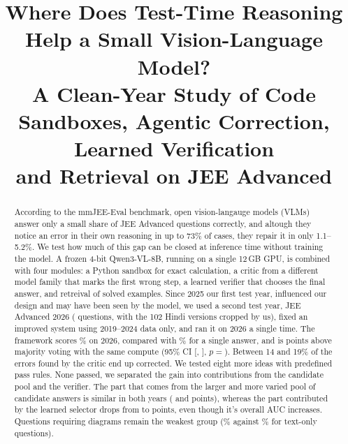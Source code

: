 \documentclass[conference]{IEEEtran}
\begin{document}
\title{Where Does Test-Time Reasoning Help a Small Vision-Language Model?\\
A Clean-Year Study of Code Sandboxes, Agentic Correction, Learned Verification\\
and Retrieval on JEE Advanced}
\author{
}
\maketitle

\begin{abstract}
According to the mmJEE-Eval benchmark, open vision-langauge models (VLMs) answer only a small
share of JEE Advanced questions correctly, and altough they notice an error in their own
reasoning in up to 73\% of cases, they repair it in only 1.1--5.2\%. We test how much of this gap can be closed at inference time without training the model. A frozen
4-bit Qwen3-VL-8B, running on a single 12\,GB GPU, is combined with four modules: a Python
sandbox for exact calculation, a critic from a different model family that marks the first wrong
step, a learned verifier that chooses the final answer, and retreival of solved examples. Since 2025 our first test year, influenced our design and may have been seen by the model, we used a second test year, JEE Advanced 2026 (\NTest{} questions, with the 102
Hindi versions cropped by us), fixed an improved system using 2019--2024 data only, and ran it
on 2026 a single time. The framework scores \ThreeAcc\% on 2026, compared with \ThreeBase\% for a
single answer, and is \ThreeVsSc{} points above majority voting with the same compute (95\% CI
[\ThreeVsScLo, \ThreeVsScHi], $p{=}$\ThreeVsScP). Between 14 and 19\% of the errors found by the
critic end up corrected. We tested eight more ideas with predefined pass rules. None passed, we separated the gain into contributions from the candidate pool and the verifier. The part that
comes from the larger and more varied pool of candidate answers is similar in both years
(\VbPoolTwentyFive{} and \VbPoolTwentySix{} points), whereas the part contributed by the learned
selector drops from \VbSelTwentyFive{} to \VbSelTwentySix{} points, even though it's overall AUC
increases. Questions requiring diagrams remain the weakest group (\ThreeImg\% against
\ThreeTxt\% for text-only questions).
\end{abstract}
\end{document}
